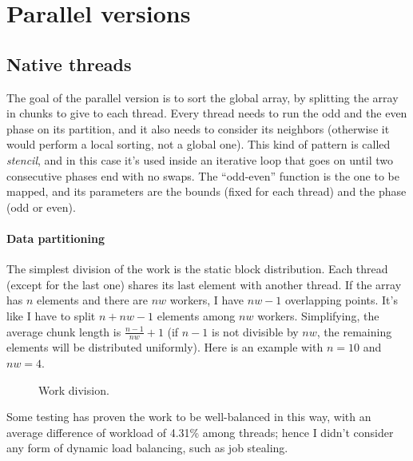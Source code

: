 \section{Parallel versions}

\subsection{Native threads}
The goal of the parallel version is to sort the global array, by splitting the array in chunks to give to each thread. Every thread needs to run the odd and the even phase on its partition, and it also needs to consider its neighbors (otherwise it would perform a local sorting, not a global one). This kind of pattern is called \textit{stencil}, and in this case it's used inside an iterative loop that goes on until two consecutive phases end with no swaps. The ``odd-even'' function is the one to be mapped, and its parameters are the bounds (fixed for each thread) and the phase (odd or even).

\paragraph{Data partitioning}
The simplest division of the work is the static block distribution. Each thread (except for the last one) shares its last element with another thread. If the array has $n$ elements and there are $nw$ workers, I have $nw - 1$ overlapping points. It's like I have to split $n + nw - 1$ elements among $nw$ workers. Simplifying, the average chunk length is $\frac{n - 1}{nw} + 1$ (if $n - 1$ is not divisible by $nw$, the remaining elements will be distributed uniformly). Here is an example with $n = 10$ and $nw = 4$.

\begin{center}
	\begin{figure}[ht!]
		\caption{Work division.} \label{array}
	\end{figure}
\end{center}
Some testing has proven the work to be well-balanced in this way, with an average difference of workload of 4.31\% among threads; hence I didn't consider any form of dynamic load balancing, such as job stealing.

